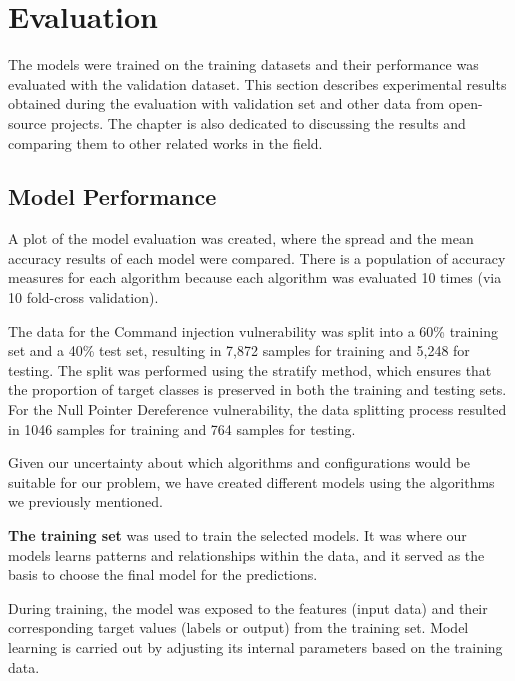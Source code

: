 % 
%  
%

\chapter{Evaluation}
\label{cha:Evaluation_chapter}

The models were trained on the training datasets and their performance was evaluated with the validation dataset. This section describes experimental results obtained during the evaluation with validation set and other data from open-source projects. The chapter is also dedicated to discussing the results and comparing them to other related works in the field.

\section{Model Performance} %
\label{sec:Model_Performance}

A plot of the model evaluation was created, where the spread and the mean accuracy results of each model were compared. There is a population of accuracy measures for each algorithm because each algorithm was evaluated 10 times (via 10 fold-cross validation).

The data for the Command injection vulnerability was split into a 60\% training set and a 40\% test set, resulting in 7,872 samples for training and 5,248 for testing. The split was performed using the stratify method, which ensures that the proportion of target classes is preserved in both the training and testing sets. For the Null Pointer Dereference vulnerability, the data splitting process resulted in 1046 samples for training and 764 samples for testing.

Given our uncertainty about which algorithms and configurations would be suitable for our problem, we have created different models using the algorithms we previously mentioned.

\textbf{The training set} was used to train the selected models. It was where our models learns patterns and relationships within the data, and it served as the basis to choose the final model for the predictions.

During training, the model was exposed to the features (input data) and their corresponding target values (labels or output) from the training set. Model learning is carried out by adjusting its internal parameters based on the training data.

